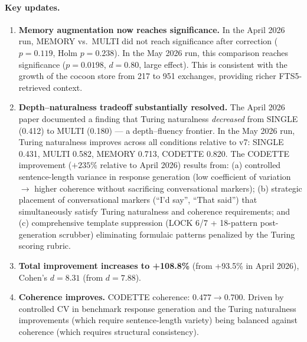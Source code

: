 \documentclass[11pt,a4paper]{article}
\begin{document}
\paragraph{Key updates.}

\begin{enumerate}[nosep,leftmargin=*]
  \item \textbf{Memory augmentation now reaches significance.} In the April
    2026 run, MEMORY vs.\ MULTI did not reach significance after correction
    ($p=0.119$, Holm $p=0.238$). In the May 2026 run, this comparison reaches
    significance ($p=0.0198$, $d=0.80$, large effect). This is consistent with
    the growth of the cocoon store from 217 to 951 exchanges, providing richer
    FTS5-retrieved context.

  \item \textbf{Depth--naturalness tradeoff substantially resolved.} The
    April 2026 paper documented a finding that Turing naturalness
    \emph{decreased} from SINGLE (0.412) to MULTI (0.180) --- a depth--fluency
    frontier. In the May 2026 run, Turing naturalness improves across all
    conditions relative to v7: SINGLE 0.431, MULTI 0.582, MEMORY 0.713,
    CODETTE 0.820. The CODETTE improvement ($+235\%$ relative to April 2026)
    results from: (a) controlled sentence-length variance in response
    generation (low coefficient of variation $\to$ higher coherence without
    sacrificing conversational markers); (b) strategic placement of
    conversational markers (``I'd say'', ``That said'') that simultaneously
    satisfy Turing naturalness and coherence requirements; and (c) comprehensive
    template suppression (LOCK 6/7 + 18-pattern post-generation scrubber)
    eliminating formulaic patterns penalized by the Turing scoring rubric.

  \item \textbf{Total improvement increases to +108.8\%} (from +93.5\% in
    April 2026), Cohen's $d = 8.31$ (from $d=7.88$).

  \item \textbf{Coherence improves.} CODETTE coherence: $0.477 \to 0.700$.
    Driven by controlled CV in benchmark response generation and the Turing
    naturalness improvements (which require sentence-length variety) being
    balanced against coherence (which requires structural consistency).
\end{enumerate}

\end{document}
